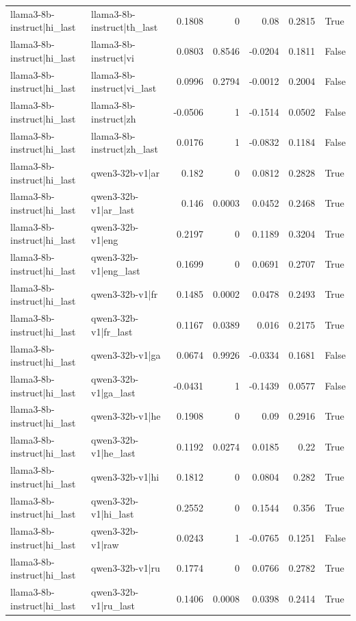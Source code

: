 \begin{table}
\begin{tabular}{l l r r r r l}
llama3-8b-instruct|hi_last & llama3-8b-instruct|th_last & 0.1808 & 0 & 0.08 & 0.2815 & True \\
llama3-8b-instruct|hi_last & llama3-8b-instruct|vi & 0.0803 & 0.8546 & -0.0204 & 0.1811 & False \\
llama3-8b-instruct|hi_last & llama3-8b-instruct|vi_last & 0.0996 & 0.2794 & -0.0012 & 0.2004 & False \\
llama3-8b-instruct|hi_last & llama3-8b-instruct|zh & -0.0506 & 1 & -0.1514 & 0.0502 & False \\
llama3-8b-instruct|hi_last & llama3-8b-instruct|zh_last & 0.0176 & 1 & -0.0832 & 0.1184 & False \\
llama3-8b-instruct|hi_last & qwen3-32b-v1|ar & 0.182 & 0 & 0.0812 & 0.2828 & True \\
llama3-8b-instruct|hi_last & qwen3-32b-v1|ar_last & 0.146 & 0.0003 & 0.0452 & 0.2468 & True \\
llama3-8b-instruct|hi_last & qwen3-32b-v1|eng & 0.2197 & 0 & 0.1189 & 0.3204 & True \\
llama3-8b-instruct|hi_last & qwen3-32b-v1|eng_last & 0.1699 & 0 & 0.0691 & 0.2707 & True \\
llama3-8b-instruct|hi_last & qwen3-32b-v1|fr & 0.1485 & 0.0002 & 0.0478 & 0.2493 & True \\
llama3-8b-instruct|hi_last & qwen3-32b-v1|fr_last & 0.1167 & 0.0389 & 0.016 & 0.2175 & True \\
llama3-8b-instruct|hi_last & qwen3-32b-v1|ga & 0.0674 & 0.9926 & -0.0334 & 0.1681 & False \\
llama3-8b-instruct|hi_last & qwen3-32b-v1|ga_last & -0.0431 & 1 & -0.1439 & 0.0577 & False \\
llama3-8b-instruct|hi_last & qwen3-32b-v1|he & 0.1908 & 0 & 0.09 & 0.2916 & True \\
llama3-8b-instruct|hi_last & qwen3-32b-v1|he_last & 0.1192 & 0.0274 & 0.0185 & 0.22 & True \\
llama3-8b-instruct|hi_last & qwen3-32b-v1|hi & 0.1812 & 0 & 0.0804 & 0.282 & True \\
llama3-8b-instruct|hi_last & qwen3-32b-v1|hi_last & 0.2552 & 0 & 0.1544 & 0.356 & True \\
llama3-8b-instruct|hi_last & qwen3-32b-v1|raw & 0.0243 & 1 & -0.0765 & 0.1251 & False \\
llama3-8b-instruct|hi_last & qwen3-32b-v1|ru & 0.1774 & 0 & 0.0766 & 0.2782 & True \\
llama3-8b-instruct|hi_last & qwen3-32b-v1|ru_last & 0.1406 & 0.0008 & 0.0398 & 0.2414 & True \\

\end{tabular}
\end{table}
